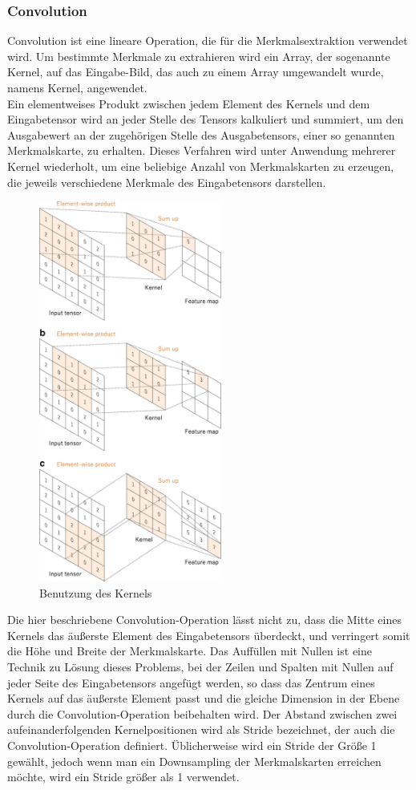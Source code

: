 \documentclass[paper=A4,pagesize=auto,12pt,headinclude=true,footinclude=true,BCOR=0mm,DIV=calc]{scrartcl}
\begin{document}
\subsubsection{Convolution}
Convolution ist eine lineare Operation, die für die Merkmalsextraktion verwendet wird. Um bestimmte Merkmale zu extrahieren wird ein Array, der sogenannte Kernel, auf das Eingabe-Bild, das auch zu einem Array umgewandelt wurde, namens Kernel, angewendet.\\
Ein elementweises Produkt zwischen jedem Element des Kernels und dem Eingabetensor wird an jeder Stelle des Tensors kalkuliert und summiert, um den Ausgabewert an der zugehörigen Stelle des Ausgabetensors, einer so genannten Merkmalskarte, zu erhalten. Dieses Verfahren wird unter Anwendung mehrerer Kernel wiederholt, um eine beliebige Anzahl von Merkmalskarten zu erzeugen, die jeweils verschiedene Merkmale des Eingabetensors darstellen.\\
\begin{figure}
	\centering
	\includegraphics[width=6cm]{"images/cnn.png"}
	\caption{Benutzung des Kernels}
	\label{useofkernel}
\end{figure}
Die hier beschriebene Convolution-Operation lässt nicht zu, dass die Mitte eines Kernels das äußerste Element des Eingabetensors überdeckt, und verringert somit die Höhe und Breite der Merkmalskarte. Das Auffüllen mit Nullen ist eine Technik zu Lösung dieses Problems, bei der Zeilen und Spalten mit Nullen auf jeder Seite des Eingabetensors angefügt werden, so dass das Zentrum eines Kernels auf das äußerste Element passt und die gleiche Dimension in der Ebene durch die Convolution-Operation beibehalten wird. Der Abstand zwischen zwei aufeinanderfolgenden Kernelpositionen wird als Stride bezeichnet, der auch die Convolution-Operation definiert. Üblicherweise wird ein Stride der Größe 1 gewählt, jedoch wenn man ein Downsampling  der Merkmalskarten erreichen möchte, wird ein Stride größer als 1 verwendet.
\end{document}
